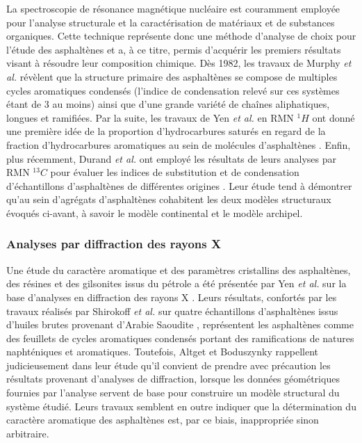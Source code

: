 La spectroscopie de résonance magnétique nucléaire est couramment employée pour l'analyse structurale et la caractérisation de matériaux et de substances organiques. 
Cette technique représente donc une méthode d'analyse de choix pour l'étude des asphaltènes et a, à ce titre, permis d'acquérir les premiers résultats visant à résoudre leur composition chimique. Dès 1982, les travaux de Murphy \textit{et al.} \cite{murphy1982determination} révèlent que la structure primaire des asphaltènes se compose de multiples cycles aromatiques condensés (l'indice de condensation relevé sur ces systèmes étant de 3 au moins) ainsi que d'une grande variété de chaînes aliphatiques, longues et ramifiées. Par la suite, les travaux de Yen \textit{et al.} en RMN $^{1}H$ ont donné une première idée de la proportion d'hydrocarbures saturés en regard de la fraction d'hydrocarbures aromatiques au sein de molécules d'asphaltènes  \cite{yen1984study}. Enfin, plus récemment, Durand \textit{et al.} ont employé les résultats de leurs analyses par RMN $^{13}C$ pour évaluer les indices de substitution et de condensation d'échantillons d'asphaltènes de différentes origines \cite{durand2010effect}. Leur étude tend à démontrer qu'au sein d'agrégats d'asphaltènes cohabitent les deux modèles structuraux évoqués ci-avant, à savoir le modèle continental et le modèle archipel. 


\subsubsection{Analyses par diffraction des rayons X}  

Une étude du caractère aromatique et des paramètres cristallins des asphaltènes, des résines et des gilsonites issus du pétrole a été présentée par Yen \textit{et al.} sur la base d'analyses en diffraction des rayons X \cite{yen1961investigation}. Leurs résultats, confortés par les travaux réalisés par Shirokoff \textit{et al.} sur quatre échantillons d'asphaltènes issus d'huiles brutes provenant d'Arabie Saoudite \cite{shirokoff1997characterization}, représentent les asphaltènes comme des feuillets de cycles aromatiques condensés portant des ramifications de natures naphténiques et aromatiques.
Toutefois, Altget et Boduszynky rappellent judicieusement dans leur étude \cite{altgeltcomposition} qu'il convient de prendre avec précaution les résultats provenant d'analyses de diffraction, lorsque les données géométriques fournies par l'analyse servent de base pour construire un modèle structural du système étudié. Leurs travaux semblent en outre indiquer que la détermination du caractère aromatique des asphaltènes est, par ce biais, inappropriée sinon arbitraire. 



